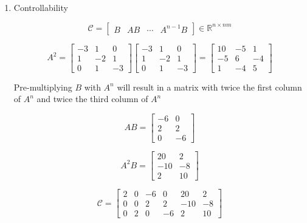 \documentclass{article}
\begin{document}
\begin{enumerate}[label=\alph*)]
    \begin{enumerate}[label=\roman*)]
        \item Controllability
 
        \[
        \mathcal{C} = 
        \begin{bmatrix}
            B & AB & \cdots & A^{n-1}B
        \end{bmatrix}
        \in \mathbb{R}^{n \times nm}
        \]

        \[
        A^2 = 
        \begin{bmatrix}
        -3 & 1 & 0 \\
        1 & -2 & 1 \\
        0 & 1 & -3
        \end{bmatrix} 
        \begin{bmatrix}
        -3 & 1 & 0 \\
        1 & -2 & 1 \\
        0 & 1 & -3
        \end{bmatrix} 
        =
        \begin{bmatrix}
            10 & -5 & 1 \\
            -5 & 6 & -4 \\
            1 & -4 & 5
        \end{bmatrix}
        \]

        Pre-multiplying $B$ with $A^n$ will result in a matrix with twice the first column of $A^n$ and twice the third column of $A^n$

        \[
        AB =
        \begin{bmatrix}
            -6 & 0 \\
            2 & 2 \\
            0 & -6
        \end{bmatrix}
        \]

        \[
        A^2B =
        \begin{bmatrix}
            20 & 2 \\
            -10 & -8 \\
            2 & 10
        \end{bmatrix}
        \]

        \[
        \mathcal{C} = 
        \begin{bmatrix}
            2 & 0 & -6 & 0 & 20 & 2 \\
            0 & 0 & 2 & 2 & -10 & -8 \\
            0 & 2 & 0 & -6 & 2 & 10 
        \end{bmatrix} 
        \]


\end{enumerate}
\end{enumerate}
\end{document}
